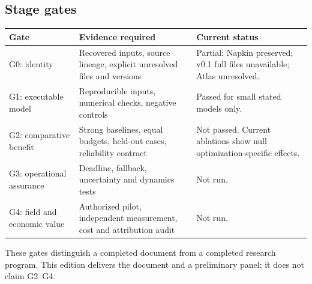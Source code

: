 \documentclass[11pt,letterpaper]{article}
\begin{document}
\subsection{Stage gates}
\begin{longtable}{P{.17\linewidth}P{.44\linewidth}P{.30\linewidth}}
\toprule Gate & Evidence required & Current status\\\midrule\endhead
G0: identity & Recovered inputs, source lineage, explicit unresolved files and versions & Partial: Napkin preserved; v0.1 full files unavailable; Atlas unresolved.\\
G1: executable model & Reproducible inputs, numerical checks, negative controls & Passed for small stated models only.\\
G2: comparative benefit & Strong baselines, equal budgets, held-out cases, reliability contract & Not passed. Current ablations show null optimization-specific effects.\\
G3: operational assurance & Deadline, fallback, uncertainty and dynamics tests & Not run.\\
G4: field and economic value & Authorized pilot, independent measurement, cost and attribution audit & Not run.\\
\bottomrule
\end{longtable}
These gates distinguish a completed document from a completed research program. This edition delivers the document and a preliminary panel; it does not claim G2--G4.
\end{document}
